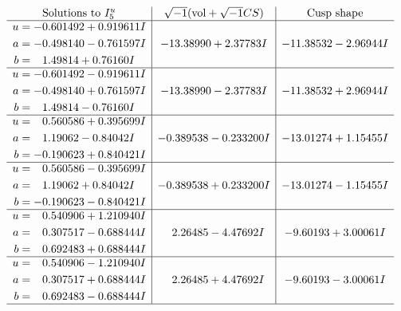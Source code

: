 \documentclass[1p]{elsarticle_modified}
\theoremstyle{definition}
\newcommand{\I}{\sqrt{-1}}
\begin{document}
$$\begin{array}{c|c|c}  
\text{Solutions to }I^u_{5}& \I (\text{vol} + \sqrt{-1}CS) & \text{Cusp shape}\\
 \hline 
\begin{aligned}
u &= -0.601492 + 0.919611 I \\
a &= -0.498140 - 0.761597 I \\
b &= \phantom{-}1.49814 + 0.76160 I\end{aligned}
 & -13.38990 + 2.37783 I & -11.38532 - 2.96944 I \\ \hline\begin{aligned}
u &= -0.601492 - 0.919611 I \\
a &= -0.498140 + 0.761597 I \\
b &= \phantom{-}1.49814 - 0.76160 I\end{aligned}
 & -13.38990 - 2.37783 I & -11.38532 + 2.96944 I \\ \hline\begin{aligned}
u &= \phantom{-}0.560586 + 0.395699 I \\
a &= \phantom{-}1.19062 - 0.84042 I \\
b &= -0.190623 + 0.840421 I\end{aligned}
 & -0.389538 - 0.233200 I & -13.01274 + 1.15455 I \\ \hline\begin{aligned}
u &= \phantom{-}0.560586 - 0.395699 I \\
a &= \phantom{-}1.19062 + 0.84042 I \\
b &= -0.190623 - 0.840421 I\end{aligned}
 & -0.389538 + 0.233200 I & -13.01274 - 1.15455 I \\ \hline\begin{aligned}
u &= \phantom{-}0.540906 + 1.210940 I \\
a &= \phantom{-}0.307517 - 0.688444 I \\
b &= \phantom{-}0.692483 + 0.688444 I\end{aligned}
 & \phantom{-}2.26485 - 4.47692 I & -9.60193 + 3.00061 I \\ \hline\begin{aligned}
u &= \phantom{-}0.540906 - 1.210940 I \\
a &= \phantom{-}0.307517 + 0.688444 I \\
b &= \phantom{-}0.692483 - 0.688444 I\end{aligned}
 & \phantom{-}2.26485 + 4.47692 I & -9.60193 - 3.00061 I\\
 \hline 
 \end{array}$$\newpage\newpage\renewcommand{\arraystretch}{1}
\end{document}
